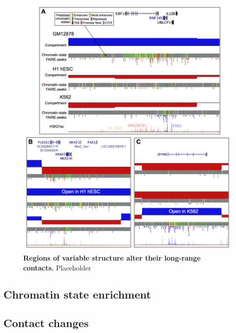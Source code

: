 \documentclass[a4paper,10pt,oneside]{book}
\begin{document}
\begin{figure}
\begin{center} 
\includegraphics[width=.9\textwidth]{figs/examplervs.png}
\captionsetup{width=\textwidth} 
\caption{ {\bf Regions of variable structure alter their long-range contacts. }
Placeholder
}\label{fig:flippedegs}
\end{center} 
\end{figure} 

\subsection{Chromatin state enrichment}


\subsection{Contact changes}
\end{document}
